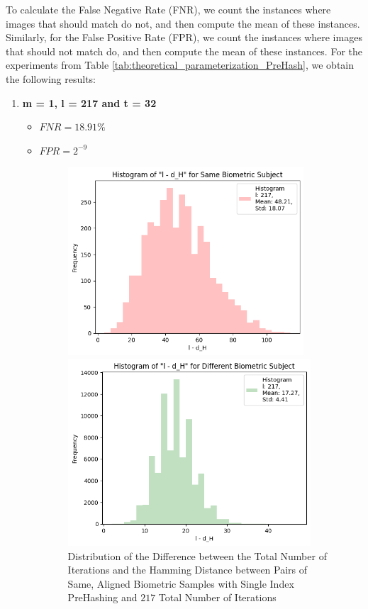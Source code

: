 To calculate the False Negative Rate (FNR), we count the instances where images that should match do not, and then compute the mean of these instances. Similarly, for the False Positive Rate (FPR), we count the instances where images that should not match do, and then compute the mean of these instances.
\newpage
For the experiments from Table \ref{tab:theoretical_parameterization_PreHash}, we obtain the following results:

\begin{enumerate}
    \item \textbf{m = 1, l = 217 and t = 32}
        \begin{itemize}
            \item $FNR = 18.91\%$
            \item $FPR = 2^{-9}$

            \begin{figure}[H]
                \centering
                \begin{minipage}[b]{0.48\linewidth}
                    \centering
                    \includegraphics[width=\linewidth,height=7cm,keepaspectratio]{latex-img/l-dHconfig1a_same.png}
                    \caption{Distribution of the Difference between the Total Number of Iterations and the Hamming Distance between Pairs of Same, Aligned Biometric Samples with Single Index PreHashing and $217$ Total Number of Iterations}
                    \label{l-dHconfig1a_same}
                \end{minipage}
                \hfill
                \begin{minipage}[b]{0.48\linewidth}
                    \centering
                    \includegraphics[width=\linewidth,height=7cm,keepaspectratio]{latex-img/l-dHconfig1a_diff.png}

\end{minipage}
\end{figure}
\end{itemize}
\end{enumerate}
